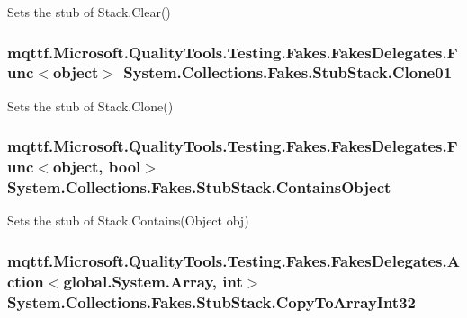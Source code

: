 Sets the stub of Stack.\-Clear()

\hypertarget{class_system_1_1_collections_1_1_fakes_1_1_stub_stack_a7c0831c9c6c5a5071ba217f102ca0ad3}{
\subsubsection[{Clone01}]{\setlength{\rightskip}{0pt plus 5cm}mqttf.\-Microsoft.\-Quality\-Tools.\-Testing.\-Fakes.\-Fakes\-Delegates.\-Func$<$object$>$ System.\-Collections.\-Fakes.\-Stub\-Stack.\-Clone01}}\label{class_system_1_1_collections_1_1_fakes_1_1_stub_stack_a7c0831c9c6c5a5071ba217f102ca0ad3}


Sets the stub of Stack.\-Clone()

\hypertarget{class_system_1_1_collections_1_1_fakes_1_1_stub_stack_aeebef1b2341ac93b0abf64c1ce3d7337}{
\subsubsection[{Contains\-Object}]{\setlength{\rightskip}{0pt plus 5cm}mqttf.\-Microsoft.\-Quality\-Tools.\-Testing.\-Fakes.\-Fakes\-Delegates.\-Func$<$object, bool$>$ System.\-Collections.\-Fakes.\-Stub\-Stack.\-Contains\-Object}}\label{class_system_1_1_collections_1_1_fakes_1_1_stub_stack_aeebef1b2341ac93b0abf64c1ce3d7337}


Sets the stub of Stack.\-Contains(\-Object obj)

\hypertarget{class_system_1_1_collections_1_1_fakes_1_1_stub_stack_a60ca620709e17ccb9c953c1523059cb0}{
\subsubsection[{Copy\-To\-Array\-Int32}]{\setlength{\rightskip}{0pt plus 5cm}mqttf.\-Microsoft.\-Quality\-Tools.\-Testing.\-Fakes.\-Fakes\-Delegates.\-Action$<$global.\-System.\-Array, int$>$ System.\-Collections.\-Fakes.\-Stub\-Stack.\-Copy\-To\-Array\-Int32}}\label{class_system_1_1_collections_1_1_fakes_1_1_stub_stack_a60ca620709e17ccb9c953c1523059cb0}


